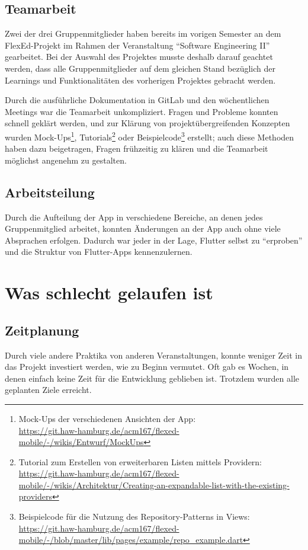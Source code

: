 \documentclass[
  a4paper,
  DIV=10,
  oneside,
  BCOR=5mm,
  parskip=half,
  numbers=noenddot
]{scrreprt}
\begin{document}
\subsection{Teamarbeit}
Zwei der drei Gruppenmitglieder haben bereits im vorigen Semester an dem FlexEd-Projekt im Rahmen der Veranstaltung ``Software Engineering II'' gearbeitet. Bei der Auswahl des Projektes musste deshalb darauf geachtet werden, dass alle Gruppenmitglieder auf dem gleichen Stand bezüglich der Learnings und Funktionalitäten des vorherigen Projektes gebracht werden.

Durch die ausführliche Dokumentation in GitLab und den wöchentlichen Meetings war die Teamarbeit unkompliziert. Fragen und Probleme konnten schnell geklärt werden, und zur Klärung von projektübergreifenden Konzepten wurden Mock-Ups\footnote{Mock-Ups der verschiedenen Ansichten der App:\\\url{https://git.haw-hamburg.de/acm167/flexed-mobile/-/wikis/Entwurf/MockUps}}, Tutorials\footnote{Tutorial zum Erstellen von erweiterbaren Listen mittels Providern:\\\url{https://git.haw-hamburg.de/acm167/flexed-mobile/-/wikis/Architektur/Creating-an-expandable-list-with-the-existing-providers}} oder Beispielcode\footnote{Beispielcode für die Nutzung des Repository-Patterns in Views:\\\url{https://git.haw-hamburg.de/acm167/flexed-mobile/-/blob/master/lib/pages/example/repo_example.dart}} erstellt; auch diese Methoden haben dazu beigetragen, Fragen frühzeitig zu klären und die Teamarbeit möglichst angenehm zu gestalten.


\subsection{Arbeitsteilung}
Durch die Aufteilung der App in verschiedene Bereiche, an denen jedes Gruppenmitglied arbeitet, konnten Änderungen an der App auch ohne viele Absprachen erfolgen. Dadurch war jeder in der Lage, Flutter selbst zu ``erproben'' und die Struktur von Flutter-Apps kennenzulernen.



\section{Was schlecht gelaufen ist}
\subsection{Zeitplanung}
Durch viele andere Praktika von anderen Veranstaltungen, konnte weniger Zeit in das Projekt investiert werden, wie zu Beginn vermutet. Oft gab es Wochen, in denen einfach keine Zeit für die Entwicklung geblieben ist. Trotzdem wurden alle geplanten Ziele erreicht.
\end{document}
